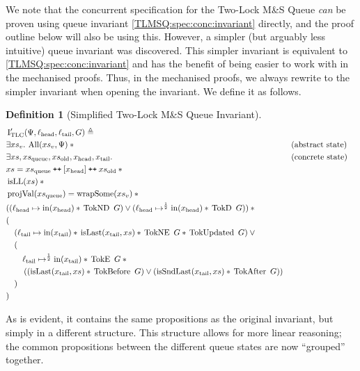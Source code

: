 \documentclass[a4paper, 10pt]{report}
\theoremstyle{definition}
\newtheorem{definition}{Definition}[section]
\newcommand{\msq}{M\&S Queue}
\newcommand{\tlmsq}{Two-Lock \msq{}}
\newcommand{\TLQueueInvariantConcSimpl}{\operatorname{I^{\prime}_{TLC}}}
\newcommand{\xsc}{xs}
\newcommand{\xsqueue}{xs_{\mathrm{queue}}}
\newcommand{\xsold}{xs_{\mathrm{old}}}
\newcommand{\isLL}{\operatorname{isLL}}
\newcommand{\AllP}{\operatorname{All}}
\newcommand{\projval}{\operatorname{projVal}}
\newcommand{\wrapsome}{\operatorname{wrapSome}}
\newcommand{\isLast}{\operatorname{isLast}}
\newcommand{\isSndLast}{\operatorname{isSndLast}}
\newcommand{\locN}[1]{\loc_{\mathrm{#1}}}
\newcommand{\lochead}{\locN{head}}
\newcommand{\loctail}{\locN{tail}}
\newcommand{\nIn}[1]{\operatorname{in}(#1)}
\newcommand{\node}{x}
\newcommand{\nodeN}[1]{\node_{\mathrm{#1}}}
\newcommand{\nodehead}{\nodeN{head}}
\newcommand{\nodetail}{\nodeN{tail}}
\newcommand{\absvalueList}{xs_v}
\newcommand{\Qg}{G}
\newcommand{\TokE}[1]{\operatorname{TokE} ~ #1}
\newcommand{\TokEQg}{\TokE{\Qg}}
\newcommand{\TokNE}[1]{\operatorname{TokNE} ~ #1}
\newcommand{\TokNEQg}{\TokNE{\Qg}}
\newcommand{\TokD}[1]{\operatorname{TokD} ~ #1}
\newcommand{\TokDQg}{\TokD{\Qg}}
\newcommand{\TokND}[1]{\operatorname{TokND} ~ #1}
\newcommand{\TokNDQg}{\TokND{\Qg}}
\newcommand{\TokBefore}[1]{\operatorname{TokBefore} ~ #1}
\newcommand{\TokBeforeQg}{\TokBefore{\Qg}}
\newcommand{\TokAfter}[1]{\operatorname{TokAfter} ~ #1}
\newcommand{\TokAfterQg}{\TokAfter{\Qg}}
\newcommand{\TokUpdated}[1]{\operatorname{TokUpdated} ~ #1}
\newcommand{\TokUpdatedQg}{\TokUpdated{\Qg}}
\newcommand\catenate{\mathbin{\text{\ttfamily\upshape ++}}}
\begin{document}
We note that the concurrent specification for the \tlmsq{} \textit{can} be proven using queue invariant \ref{TLMSQ:spec:conc:invariant} directly, and the proof outline below will also be using this. However, a simpler (but arguably less intuitive) queue invariant was discovered. This simpler invariant is equivalent to \ref{TLMSQ:spec:conc:invariant} and has the benefit of being easier to work with in the mechanised proofs. Thus, in the mechanised proofs, we always rewrite to the simpler invariant when opening the invariant. We define it as follows.
\begin{definition}[Simplified \tlmsq{} Invariant]\label{TLMSQ:spec:conc:invariant:simple}
  \begin{align*}
    &\TLQueueInvariantConcSimpl(\Psi, \lochead, \loctail, \Qg) \eqdef\\
    &\Exists \absvalueList. \AllP(\absvalueList, \Psi) \star{} &&\text{(abstract state)}\\
    &\Exists \xsc, \xsqueue, \xsold, \nodehead, \nodetail . &&\text{(concrete state)}\\
    &\xsc = \xsqueue \catenate [\nodehead] \catenate \xsold \star{}\\
    &\isLL(\xsc) \star{}\\
    &\projval(\xsqueue) = \wrapsome(\absvalueList) \star{}\\
    &((\lochead \mapsto \nIn{\nodehead} \star{} \TokNDQg) \lor{} (\lochead \mapsto^{\frac{1}{2}} \nIn{\nodehead} \star{} \TokDQg)) \star{}\\
    &(\\
    &\quad(\loctail \mapsto \nIn{\nodetail} \star{} \isLast(\nodetail, \xsc) \star{} \TokNEQg \star{} \TokUpdatedQg) \lor{} \\
    &\quad(\\
    &\quad\quad \loctail \mapsto^{\frac{1}{2}} \nIn{\nodetail} \star{} \TokEQg \star{}\\
    &\quad\quad\left((\isLast(\nodetail, \xsc) \star{} \TokBeforeQg) \lor{} (\isSndLast(\nodetail, \xsc) \star{} \TokAfterQg)\right)\\
    &\quad)\\
    &)
  \end{align*}
\end{definition}
As is evident, it contains the same propositions as the original invariant, but simply in a different structure. This structure allows for more linear reasoning; the common propositions between the different queue states are now ``grouped'' together.
\end{document}
